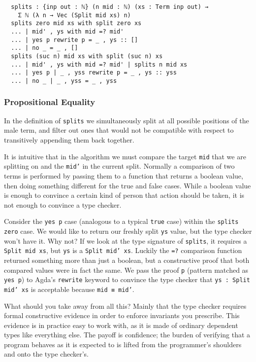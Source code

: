 \documentclass[runningheads,a4paper]{llncs}
\begin{document}
\begin{verbatim}
  splits : {inp out : ℕ} (n mid : ℕ) (xs : Term inp out) →
    Σ ℕ (λ n → Vec (Split mid xs) n)
  splits zero mid xs with split zero xs
  ... | mid' , ys with mid =? mid'
  ... | yes p rewrite p = _ , ys :: []
  ... | no _ = _ , []
  splits (suc n) mid xs with split (suc n) xs
  ... | mid' , ys with mid =? mid' | splits n mid xs
  ... | yes p | _ , yss rewrite p = _ , ys :: yss
  ... | no _ | _ , yss = _ , yss
\end{verbatim}

\subsubsection{Propositional Equality}

In the definition of \texttt{splits} we simultaneously split at all
possible positions of the male term, and filter out ones that would
not be compatible with respect to transitively appending them back
together.

It is intuitive that in the algorithm we must compare the target \texttt{mid}
that we are splitting on and the \texttt{mid'} in the current
split. Normally a comparison of two terms is performed by passing them
to a function that returns a boolean value, then doing something
different for the true and false cases. While a boolean value is
enough to convince a certain kind of person that action should be
taken, it is not enough to convince a type checker.

Consider the \texttt{yes p} case (analogous to a typical \texttt{true}
case) within the \texttt{splits zero} case. We would like to return
our freshly split \texttt{ys} value, but the type checker won't have
it. Why not? If we look at the type signature of \texttt{splits}, it
requires a \texttt{Split mid xs}, but \texttt{ys} is a \texttt{Split mid'
  xs}. Luckily the \texttt{=?} comparison function returned something
more than just a boolean, but a constructive proof that both compared
values were in fact the same. We pass the proof \texttt{p} (pattern
matched as \texttt{yes p}) to Agda's \texttt{rewrite} keyword to
convince the type checker that \texttt{ys : Split mid' xs} is acceptable
because \texttt{mid ≡ mid'}.

What should you take away from all this? Mainly that the type checker
requires formal constructive evidence in order to enforce
invariants you prescribe. This evidence is in practice easy to work
with, as it is made of ordinary dependent types like everything
else. The payoff is confidence; the burden of verifying that
a program behaves as it is expected to is lifted from the programmer's
shoulders and onto the type checker's.
\end{document}
